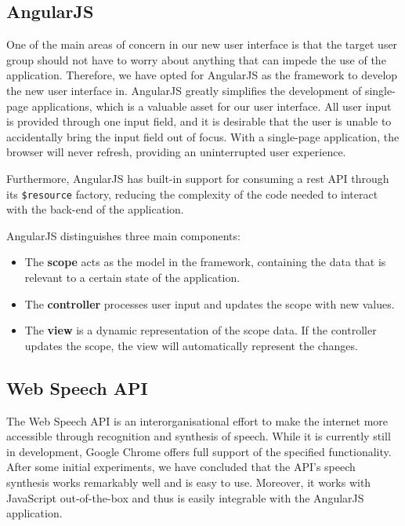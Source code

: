 \subsection{AngularJS}
\label{subsection:angularjs}
One of the main areas of concern in our new user interface is that the target user group should not have to worry about anything that can impede the use of the application. Therefore, we have opted for AngularJS\cite{Angul50:online} as the framework to develop the new user interface in. AngularJS greatly simplifies the development of single-page applications, which is a valuable asset for our user interface. All user input is provided through one input field, and it is desirable that the user is unable to accidentally bring the input field out of focus. With a single-page application, the browser will never refresh, providing an uninterrupted user experience.

Furthermore, AngularJS has built-in support for consuming a \acrshort{rest} API through its \newline \texttt{\$resource} factory, reducing the complexity of the code needed to interact with the back-end of the application.

AngularJS distinguishes three main components:

\begin{itemize}
	\item The \textbf{scope} acts as the model in the framework, containing the data that is relevant to a certain state of the application.
	\item The \textbf{controller} processes user input and updates the scope with new values.
	\item The \textbf{view} is a dynamic representation of the scope data. If the controller updates the scope, the view will automatically represent the changes.
\end{itemize}

\subsection{Web Speech API}
\label{subsection:webspeechapi}
The Web Speech API is an interorganisational effort to make the internet more accessible through recognition and synthesis of speech\cite{WebSp68:online}. While it is currently still in development, Google Chrome offers full support of the specified functionality. After some initial experiments, we have concluded that the API's speech synthesis works remarkably well and is easy to use. Moreover, it works with JavaScript out-of-the-box and thus is easily integrable with the AngularJS application.

